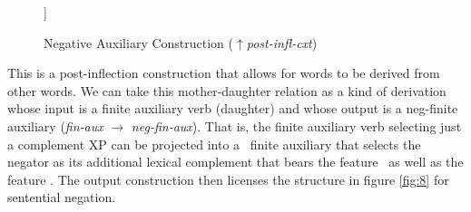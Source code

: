 \documentclass[output=paper]{langsci/langscibook}
\begin{document}
{\begin{exe}
\begin{xlist}
\begin{exe}
\begin{xlist}
\begin{figure}[h!]
	\begin{forest}
		[\begin{avm}
			\[\tp{neg-fin-aux}\\
			syn & \[head & \[aux & $+$\\
			vform & fin\\
			neg & $+$\]\]\\
			arg-st & \<\@{1}XP{,} $\textnormal{Adv}$ \[lex & $+$\\neg & $+$\]{,} \@{2}XP\>\]
		\end{avm}
			[\begin{avm}
				\[\tp{fin-aux}\\
				syn & \[head & \[aux & $+$\\
				neg & $+$\]\]\\
				arg-st & \<\@{1}XP{,} \@{2}XP\>\]
			\end{avm}]]
	\end{forest}
\caption{Negative Auxiliary Construction ($\uparrow${\it post-infl-cxt})}\label{fig:7}
\end{figure}
%
This is a post-inflection construction that allows for words to
be derived from other words. We can take this mother-daughter relation as a kind of derivation whose input is a finite auxiliary verb (daughter)
and whose output is a neg-finite auxiliary ({\it fin-aux} $\rightarrow$ {\it neg-fin-aux}). That is, the finite auxiliary verb selecting just a
complement XP can be projected into a \NEG\ finite auxiliary that selects the negator
as its additional lexical complement that bears the feature \NEG\ as well
as the feature \LEX.
%
%
The output construction then licenses the structure in figure \ref{fig:8} for
sentential negation.


\end{xlist}
\end{exe}
\end{xlist}
\end{exe}}
\end{document}

